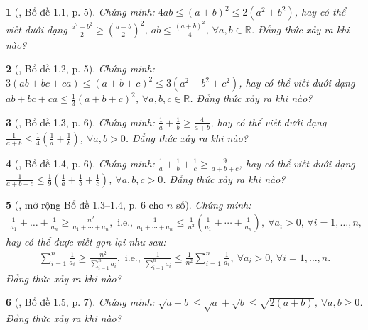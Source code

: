 \documentclass{article}
\newtheorem{baitoan}{}
\begin{document}
\begin{baitoan}[\cite{Son_Nghiep_Trung_Can_bdt}, Bổ đề 1.1, p. 5]
	Chứng minh: $4ab\le(a + b)^2\le2(a^2 + b^2)$, hay có thể viết dưới dạng $\frac{a^2 + b^2}{2}\ge\left(\frac{a + b}{2}\right)^2$, $ab\le\frac{(a + b)^2}{4}$, $\forall a,b\in\mathbb{R}$. Đẳng thức xảy ra khi nào?
\end{baitoan}

\begin{baitoan}[\cite{Son_Nghiep_Trung_Can_bdt}, Bổ đề 1.2, p. 5]
	Chứng minh: $3(ab + bc + ca)\le(a + b + c)^2\le3(a^2 + b^2 + c^2)$, hay có thể viết dưới dạng $ab + bc + ca\le\frac{1}{3}(a + b + c)^2$, $\forall a,b,c\in\mathbb{R}$. Đẳng thức xảy ra khi nào?
\end{baitoan}

\begin{baitoan}[\cite{Son_Nghiep_Trung_Can_bdt}, Bổ đề 1.3, p. 6]
	Chứng minh: $\frac{1}{a} + \frac{1}{b}\ge\frac{4}{a + b}$, hay có thể viết dưới dạng $\frac{1}{a + b}\le\frac{1}{4}\left(\frac{1}{a} + \frac{1}{b}\right)$, $\forall a,b > 0$. Đẳng thức xảy ra khi nào?
\end{baitoan}

\begin{baitoan}[\cite{Son_Nghiep_Trung_Can_bdt}, Bổ đề 1.4, p. 6]
	Chứng minh: $\frac{1}{a} + \frac{1}{b} + \frac{1}{c}\ge\frac{9}{a + b + c}$, hay có thể viết dưới dạng $\frac{1}{a + b + c}\le\frac{1}{9}\left(\frac{1}{a} + \frac{1}{b} + \frac{1}{c}\right)$, $\forall a,b,c > 0$. Đẳng thức xảy ra khi nào?
\end{baitoan}

\begin{baitoan}[\cite{Son_Nghiep_Trung_Can_bdt}, mở rộng Bổ đề 1.3--1.4, p. 6 cho $n$ số]
	Chứng minh:
	\begin{align*}
		\frac{1}{a_1} + \ldots + \frac{1}{a_n}\ge\frac{n^2}{a_1 + \cdots + a_n},\mbox{ i.e., }\frac{1}{a_1 + \cdots + a_n}\le\frac{1}{n^2}\left(\frac{1}{a_1} + \cdots + \frac{1}{a_n}\right),\ \forall a_i > 0,\,\forall i = 1,\ldots,n,
	\end{align*}
	hay có thể được viết gọn lại như sau:
	\begin{align*}
		\sum_{i=1}^{n} \frac{1}{a_i}\ge\frac{n^2}{\sum_{i=1}^n a_i},\mbox{ i.e., }\frac{1}{\sum_{i=1}^n a_i}\le\frac{1}{n^2}\sum_{i=1}^n \frac{1}{a_i},\ \forall a_i > 0,\,\forall i = 1,\ldots,n.
	\end{align*}
	Đẳng thức xảy ra khi nào?
\end{baitoan}

\begin{baitoan}[\cite{Son_Nghiep_Trung_Can_bdt}, Bổ đề 1.5, p. 7]
	Chứng minh: $\sqrt{a + b}\le\sqrt{a} + \sqrt{b}\le\sqrt{2(a + b)}$, $\forall a,b\ge 0$. Đẳng thức xảy ra khi nào?
\end{baitoan}
\end{document}
